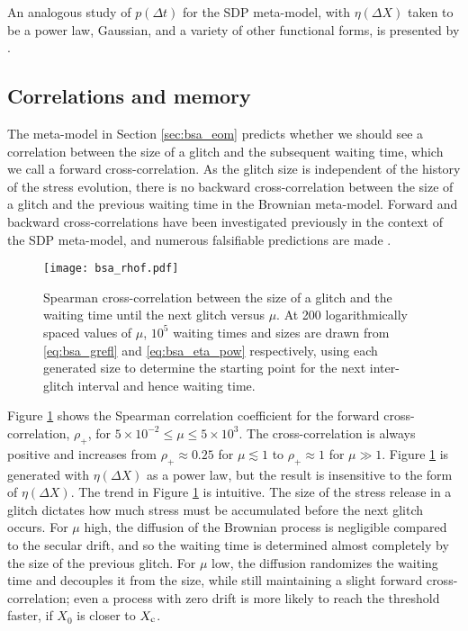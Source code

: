 An analogous study of $p(\Delta t)$ for the SDP meta-model, with $\eta(\Delta X)$ taken to be a power law, Gaussian, and a variety of other functional forms, is presented by \citet{Carlin2019quasi}.

\subsection{Correlations and memory}
\label{sec:bsa_correl}
The meta-model in Section \ref{sec:bsa_eom} predicts whether we should see a correlation between the size of a glitch and the subsequent waiting time, which we call a forward cross-correlation. As the glitch size is independent of the history of the stress evolution, there is no backward cross-correlation between the size of a glitch and the previous waiting time in the Brownian meta-model. Forward and backward cross-correlations have been investigated previously in the context of the SDP meta-model, and numerous falsifiable predictions are made \citep{Melatos2018, Carlin2019quasi,Carlin2019ac}. 

\begin{figure}
\centering
\texttt{[image: bsa\_rhof.pdf]}
\caption{Spearman cross-correlation between the size of a glitch and the waiting time until the next glitch versus $\mu$. At 200 logarithmically spaced values of $\mu$, $10^5$ waiting times and sizes are drawn from \eqref{eq:bsa_grefl} and \eqref{eq:bsa_eta_pow} respectively, using each generated size to determine the starting point for the next inter-glitch interval and hence waiting time.}
\label{fig:bsa_correl}
\end{figure}

Figure \ref{fig:bsa_correl} shows the Spearman correlation coefficient for the forward cross-correlation, $\rho_+$, for $5\times10^{-2} \leq \mu \leq 5\times10^3$. The cross-correlation is always positive and increases from $\rho_+ \approx 0.25$ for $\mu \lesssim 1$ to $\rho_+ \approx 1$ for $\mu \gg 1$. Figure \ref{fig:bsa_correl} is generated with $\eta(\Delta X)$ as a power law, but the result is insensitive to the form of $\eta(\Delta X)$. The trend in Figure \ref{fig:bsa_correl} is intuitive. The size of the stress release in a glitch dictates how much stress must be accumulated before the next glitch occurs. For $\mu$ high, the diffusion of the Brownian process is negligible compared to the secular drift, and so the waiting time is determined almost completely by the size of the previous glitch. For $\mu$ low, the diffusion randomizes the waiting time and decouples it from the size, while still maintaining a slight forward cross-correlation; even a process with zero drift is more likely to reach the threshold faster, if $X_0$ is closer to $X_\textrm{c}$. 
 

